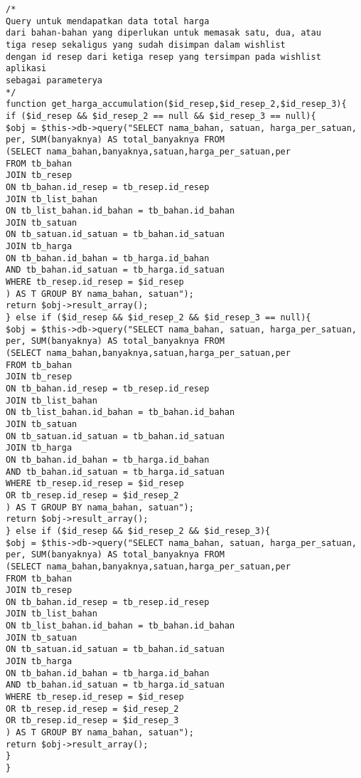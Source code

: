 \documentclass{jtetiskripsi}
\begin{document}
\begin{lstlisting}
/*
Query untuk mendapatkan data total harga
dari bahan-bahan yang diperlukan untuk memasak satu, dua, atau
tiga resep sekaligus yang sudah disimpan dalam wishlist
dengan id resep dari ketiga resep yang tersimpan pada wishlist aplikasi
sebagai parameterya
*/
function get_harga_accumulation($id_resep,$id_resep_2,$id_resep_3){
if ($id_resep && $id_resep_2 == null && $id_resep_3 == null){
$obj = $this->db->query("SELECT nama_bahan, satuan, harga_per_satuan,
per, SUM(banyaknya) AS total_banyaknya FROM
(SELECT nama_bahan,banyaknya,satuan,harga_per_satuan,per
FROM tb_bahan
JOIN tb_resep
ON tb_bahan.id_resep = tb_resep.id_resep
JOIN tb_list_bahan
ON tb_list_bahan.id_bahan = tb_bahan.id_bahan
JOIN tb_satuan
ON tb_satuan.id_satuan = tb_bahan.id_satuan
JOIN tb_harga
ON tb_bahan.id_bahan = tb_harga.id_bahan
AND tb_bahan.id_satuan = tb_harga.id_satuan
WHERE tb_resep.id_resep = $id_resep
) AS T GROUP BY nama_bahan, satuan");
return $obj->result_array();
} else if ($id_resep && $id_resep_2 && $id_resep_3 == null){
$obj = $this->db->query("SELECT nama_bahan, satuan, harga_per_satuan,
per, SUM(banyaknya) AS total_banyaknya FROM
(SELECT nama_bahan,banyaknya,satuan,harga_per_satuan,per
FROM tb_bahan
JOIN tb_resep
ON tb_bahan.id_resep = tb_resep.id_resep
JOIN tb_list_bahan
ON tb_list_bahan.id_bahan = tb_bahan.id_bahan
JOIN tb_satuan
ON tb_satuan.id_satuan = tb_bahan.id_satuan
JOIN tb_harga
ON tb_bahan.id_bahan = tb_harga.id_bahan
AND tb_bahan.id_satuan = tb_harga.id_satuan
WHERE tb_resep.id_resep = $id_resep
OR tb_resep.id_resep = $id_resep_2
) AS T GROUP BY nama_bahan, satuan");
return $obj->result_array();
} else if ($id_resep && $id_resep_2 && $id_resep_3){
$obj = $this->db->query("SELECT nama_bahan, satuan, harga_per_satuan,
per, SUM(banyaknya) AS total_banyaknya FROM
(SELECT nama_bahan,banyaknya,satuan,harga_per_satuan,per
FROM tb_bahan
JOIN tb_resep
ON tb_bahan.id_resep = tb_resep.id_resep
JOIN tb_list_bahan
ON tb_list_bahan.id_bahan = tb_bahan.id_bahan
JOIN tb_satuan
ON tb_satuan.id_satuan = tb_bahan.id_satuan
JOIN tb_harga
ON tb_bahan.id_bahan = tb_harga.id_bahan
AND tb_bahan.id_satuan = tb_harga.id_satuan
WHERE tb_resep.id_resep = $id_resep
OR tb_resep.id_resep = $id_resep_2
OR tb_resep.id_resep = $id_resep_3
) AS T GROUP BY nama_bahan, satuan");
return $obj->result_array();
}
}

	\end{lstlisting}	
\end{document}
